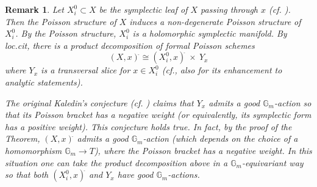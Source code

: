 \documentclass[12pt,a4paper]{amsart}
\newtheorem{Rem}[Thm]{Remark}
\theoremstyle{remark}
\theoremstyle{definition}
\begin{document}
\begin{Rem}\label{Kaledin's conj}
Let $X_i^0 \subset X$ be the symplectic leaf of $X$ passing through $x$ (cf. \cite[Theorem 2.3]{Kaledin}).  
Then the Poisson structure of $X$ induces a non-degenerate Poisson structure of $X_i^0$. By the Poisson structure,  
$X_i^0$ is a holomorphic symplectic manifold.  
By {\it loc.cit}, 
there is a product decomposition of formal Poisson schemes 
$$(X, x)^{\hat{}} \cong (X_i^0, x)^{\hat{}} \: \hat{\times} \: Y_x$$ where $Y_x$ is a transversal slice for 
$x \in X_i^0$ 
(cf., also \cite[Appendix]{KapSch} for its enhancement to 
analytic statements). 

The original Kaledin's conjecture (cf. \cite[Conjecture 1.8]{Kaledin 2}) claims 
that $Y_x$ admits a good $\mathbb{G}_m$-action so that its Poisson bracket has a 
negative weight (or equivalently, its symplectic form has a positive weight). 
This conjecture holds true. In fact, by the proof of the Theorem, $(X, x)^{\hat{}}$ admits a good $\mathbb{G}_m$-action (which depends on the choice of a homomorphism 
$\mathbb{G}_m \to T$), where the Poisson bracket has a negative weight. In this situation one can take the 
product decomposition above in a $\mathbb{G}_m$-equivariant way so that both 
$(X_i^0, x)^{\hat{}}$ and $Y_x$ have good $\mathbb{G}_m$-actions.      
\end{Rem}
\end{document}
